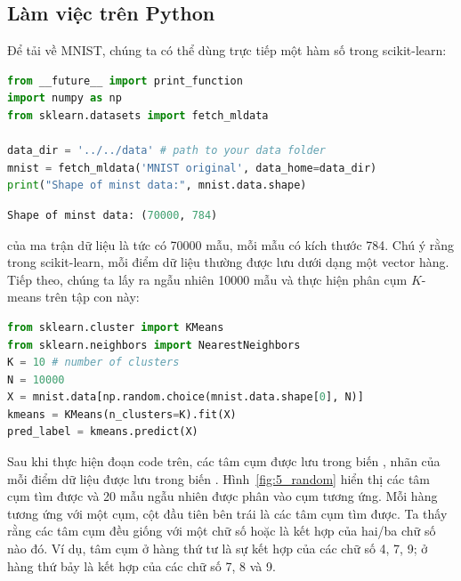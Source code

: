 

\subsection{Làm việc trên Python}
Để tải về MNIST, chúng ta có thể dùng trực tiếp một hàm số trong scikit-learn:

\begin{lstlisting}[language=Python]
from __future__ import print_function
import numpy as np
from sklearn.datasets import fetch_mldata

data_dir = '../../data' # path to your data folder
mnist = fetch_mldata('MNIST original', data_home=data_dir)
print("Shape of minst data:", mnist.data.shape)
\end{lstlisting}
\kq
\begin{lstlisting}[language=Python]
Shape of minst data: (70000, 784)
\end{lstlisting}
 của ma trận dữ liệu  là
 tức có 70000 mẫu, mỗi mẫu có kích thước 784. Chú ý
rằng trong scikit-learn, mỗi điểm dữ liệu thường được lưu dưới dạng một vector
hàng. Tiếp theo, chúng ta lấy ra ngẫu nhiên 10000 mẫu và thực hiện phân cụm $K$-means
trên tập con này:
\begin{lstlisting}[language=Python]
from sklearn.cluster import KMeans
from sklearn.neighbors import NearestNeighbors
K = 10 # number of clusters
N = 10000
X = mnist.data[np.random.choice(mnist.data.shape[0], N)]
kmeans = KMeans(n_clusters=K).fit(X)
pred_label = kmeans.predict(X)
\end{lstlisting}





Sau khi thực hiện đoạn code trên, các tâm cụm được lưu trong biến
, nhãn của mỗi điểm dữ liệu được lưu
trong biến . Hình~\ref{fig:5_random} hiển thị các tâm
cụm tìm được và 20 mẫu ngẫu nhiên được phân vào cụm tương ứng. Mỗi hàng tương
ứng với một cụm, cột đầu tiên bên trái là các tâm cụm tìm được. Ta thấy rằng các
tâm cụm đều giống với một chữ số hoặc là kết hợp của hai/ba chữ số nào đó. Ví
dụ, tâm cụm ở hàng thứ tư là sự kết hợp của các chữ số 4, 7, 9; ở hàng thứ bảy là kết
hợp của các chữ số 7, 8 và 9.





